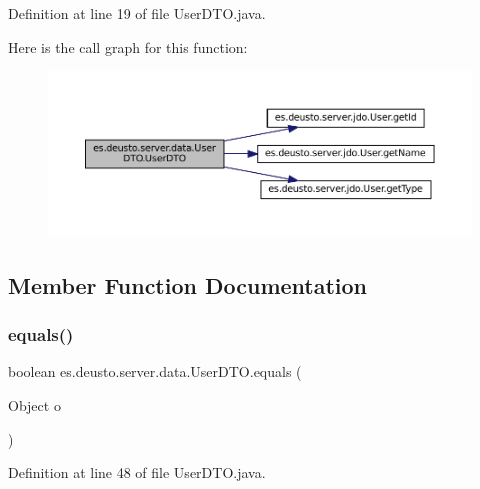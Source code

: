 Definition at line 19 of file User\+D\+T\+O.\+java.

Here is the call graph for this function\+:
\nopagebreak
\begin{figure}[H]
\begin{center}
\leavevmode
\includegraphics[width=350pt]{classes_1_1deusto_1_1server_1_1data_1_1_user_d_t_o_ab05044a5b24bdbdcc1bbe582b7268b71_cgraph}
\end{center}
\end{figure}


\subsection{Member Function Documentation}
\mbox{\label{classes_1_1deusto_1_1server_1_1data_1_1_user_d_t_o_a2963ea7c4e6ae150e958abc1f0ce2bbb}} 
\subsubsection{\texorpdfstring{equals()}{equals()}}
{\footnotesize\ttfamily boolean es.\+deusto.\+server.\+data.\+User\+D\+T\+O.\+equals (\begin{DoxyParamCaption}\item[{Object}]{o }\end{DoxyParamCaption})}



Definition at line 48 of file User\+D\+T\+O.\+java.

